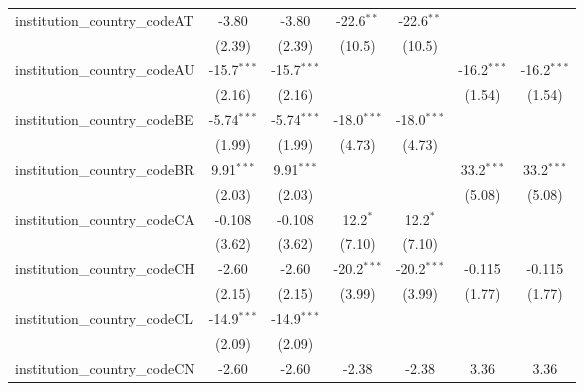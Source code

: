 \begin{tabular}{lcccccc}
   institution\_country\_codeAT          & -3.80         & -3.80         & -22.6$^{**}$  & -22.6$^{**}$  &               &   \\   
                                         & (2.39)        & (2.39)        & (10.5)        & (10.5)        &               &   \\   
   institution\_country\_codeAU          & -15.7$^{***}$ & -15.7$^{***}$ &               &               & -16.2$^{***}$ & -16.2$^{***}$\\   
                                         & (2.16)        & (2.16)        &               &               & (1.54)        & (1.54)\\   
   institution\_country\_codeBE          & -5.74$^{***}$ & -5.74$^{***}$ & -18.0$^{***}$ & -18.0$^{***}$ &               &   \\   
                                         & (1.99)        & (1.99)        & (4.73)        & (4.73)        &               &   \\   
   institution\_country\_codeBR          & 9.91$^{***}$  & 9.91$^{***}$  &               &               & 33.2$^{***}$  & 33.2$^{***}$\\   
                                         & (2.03)        & (2.03)        &               &               & (5.08)        & (5.08)\\   
   institution\_country\_codeCA          & -0.108        & -0.108        & 12.2$^{*}$    & 12.2$^{*}$    &               &   \\   
                                         & (3.62)        & (3.62)        & (7.10)        & (7.10)        &               &   \\   
   institution\_country\_codeCH          & -2.60         & -2.60         & -20.2$^{***}$ & -20.2$^{***}$ & -0.115        & -0.115\\   
                                         & (2.15)        & (2.15)        & (3.99)        & (3.99)        & (1.77)        & (1.77)\\   
   institution\_country\_codeCL          & -14.9$^{***}$ & -14.9$^{***}$ &               &               &               &   \\   
                                         & (2.09)        & (2.09)        &               &               &               &   \\   
   institution\_country\_codeCN          & -2.60         & -2.60         & -2.38         & -2.38         & 3.36          & 3.36\\   

\end{tabular}
